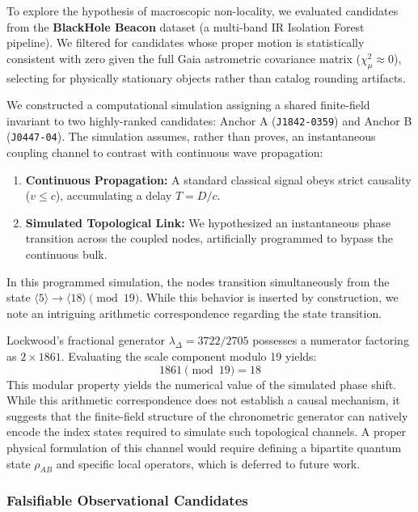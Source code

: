 To explore the hypothesis of macroscopic non-locality, we evaluated candidates from the \textbf{BlackHole Beacon} dataset (a multi-band IR Isolation Forest pipeline). We filtered for candidates whose proper motion is statistically consistent with zero given the full Gaia astrometric covariance matrix ($\chi_\mu^2 \approx 0$), selecting for physically stationary objects rather than catalog rounding artifacts.

We constructed a computational simulation assigning a shared finite-field invariant to two highly-ranked candidates: Anchor A (\texttt{J1842-0359}) and Anchor B (\texttt{J0447-04}). The simulation assumes, rather than proves, an instantaneous coupling channel to contrast with continuous wave propagation:
\begin{enumerate}
    \item \textbf{Continuous Propagation:} A standard classical signal obeys strict causality ($v \leq c$), accumulating a delay $T = D/c$.
    \item \textbf{Simulated Topological Link:} We hypothesized an instantaneous phase transition across the coupled nodes, artificially programmed to bypass the continuous bulk.
\end{enumerate}

In this programmed simulation, the nodes transition simultaneously from the state $\langle 5 \rangle \to \langle 18 \rangle \pmod{19}$. While this behavior is inserted by construction, we note an intriguing arithmetic correspondence regarding the state transition. 

Lockwood's fractional generator $\lambda_\Delta = 3722/2705$ possesses a numerator factoring as $2 \times 1861$. Evaluating the scale component modulo 19 yields:
\begin{equation}
1861 \pmod{19} = 18
\end{equation}
This modular property yields the numerical value of the simulated phase shift. While this arithmetic correspondence does not establish a causal mechanism, it suggests that the finite-field structure of the chronometric generator can natively encode the index states required to simulate such topological channels. A proper physical formulation of this channel would require defining a bipartite quantum state $\rho_{AB}$ and specific local operators, which is deferred to future work.

\subsubsection{Falsifiable Observational Candidates}

